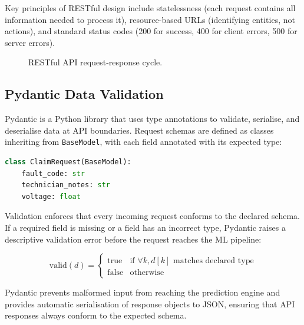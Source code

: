 \documentclass[10pt,a4paper]{article}
\begin{document}
Key principles of RESTful design include statelessness (each request contains all information needed to process it), resource-based URLs (identifying entities, not actions), and standard status codes (200 for success, 400 for client errors, 500 for server errors).

\begin{figure}[H]
    \centering
    \caption{RESTful API request-response cycle.}
    \label{fig:rest-api}
\end{figure}

\subsection{Pydantic Data Validation}
\label{sec:pydantic}

Pydantic is a Python library that uses type annotations to validate, serialise, and deserialise data at API boundaries. Request schemas are defined as classes inheriting from \texttt{BaseModel}, with each field annotated with its expected type:

\begin{lstlisting}[language=Python]
class ClaimRequest(BaseModel):
    fault_code: str
    technician_notes: str
    voltage: float
\end{lstlisting}

Validation enforces that every incoming request conforms to the declared schema. If a required field is missing or a field has an incorrect type, Pydantic raises a descriptive validation error before the request reaches the ML pipeline:

\begin{equation}
\text{valid}(d) = \begin{cases} \text{true} & \text{if } \forall k, d[k] \text{ matches declared type} \\ \text{false} & \text{otherwise} \end{cases}
\label{eq:pydantic-validation}
\end{equation}

Pydantic prevents malformed input from reaching the prediction engine and provides automatic serialisation of response objects to JSON, ensuring that API responses always conform to the expected schema.
\end{document}
